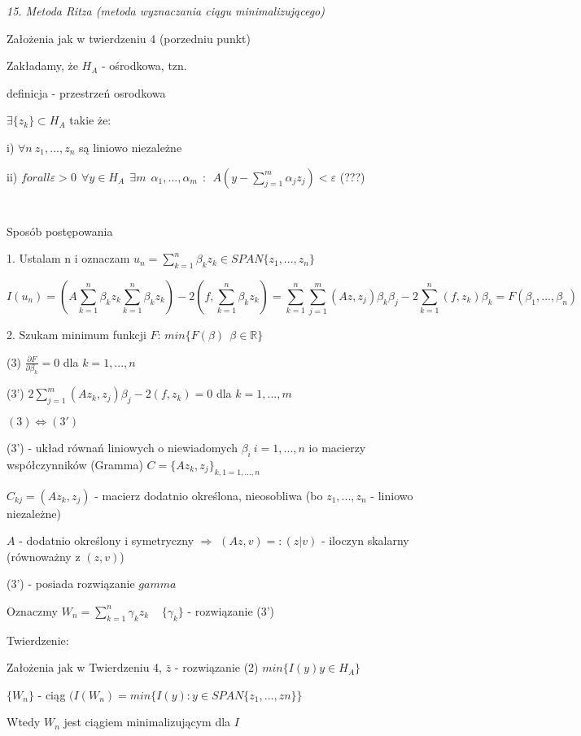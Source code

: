\textit{15. Metoda Ritza (metoda wyznaczania ciągu minimalizującego)}

Założenia jak w twierdzeniu 4 (porzedniu punkt)

Zakładamy, że $H_A$ - ośrodkowa, tzn.

definicja - przestrzeń osrodkowa

$\exists \{z_k\} \subset H_A$ takie że:

i) $\forall n\ z_1, ..., z_n$ są liniowo niezależne

ii) $forall \varepsilon > 0\ \ \forall y \in H_A \ \ \exists m\ \ \alpha _1, ..., \alpha _m\ \ : \ \ A(y - \sum_{j=1}^{m} \alpha _j z_j) < \varepsilon$ (???)

$\ $

$\ $

Sposób postępowania

1. Ustalam n i oznaczam $u_n = \sum_{k=1}^{n} \beta _k z_k \in SPAN\{z_1, ..., z_n\}$

\[ I(u_n) = (A\sum_{k=1}^{n} \beta _k z_k \sum_{k=1}^{n} \beta _k z_k) - 2(f, \sum_{k=1}^{n} \beta _k z_k) = \sum_{k=1}^{n}\sum_{j=1}^{m} (Az,z_j) \beta _k \beta _j - 2\sum_{k=1}^{n} (f, z_k) \beta _k = F(\beta _1, ..., \beta _n)\]

2. Szukam minimum funkcji $F$: $min\{F(\beta)\ \ \beta \in \mathbb{R}\}$

(3) $\frac{\partial F}{\partial \beta _k} = 0$ dla $k = 1,...,n$

(3') $2 \sum_{j=1}^{m} (Az_k, z_j) \beta _j - 2(f, z_k) = 0$ dla $k = 1,...,m$

$ (3) \Leftrightarrow (3') $

(3') - układ równań liniowych o niewiadomych $\beta _i\ i = 1,...,n$ io macierzy współczynników (Gramma) $C = \{ Az_k, z_j \}_{k,1 = 1,...,n}$

$C_{kj} = (Az_k, z_j)$ - macierz dodatnio określona, nieosobliwa (bo $z_1,...,z_n$ - liniowo niezależne)

$A$ - dodatnio określony i symetryczny $\Rightarrow$ $(Az,v) =: (z|v)$ - iloczyn skalarny (równoważny z $(z,v)$)

(3') - posiada rozwiązanie $gamma$

Oznaczmy $W_n = \sum_{k=1}^{n} \gamma _k z_k\ \ \ \ \ \{\gamma _k\}$ - rozwiązanie (3')

Twierdzenie:

Założenia jak w Twierdzeniu 4, $\bar{z}$ - rozwiązanie (2) $ min\{ I(y) y \in H_A \}$

$\{W_n\}$ - ciąg $(I(W_n) = min\{I(y): y \in SPAN\{z_1,...,zn\}\}$

Wtedy ${W_n}$ jest ciągiem minimalizującym dla $I$

